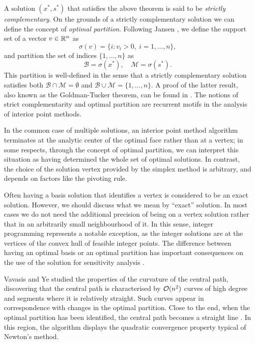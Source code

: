 A solution $(x^*,s^*)$ that satisfies the above theorem is said to be
{\em strictly complementary}. 
On the grounds of a strictly complementary
solution we can define the concept of {\em optimal partition}.
Following Jansen \cite{phd:Jansen}, we define the support set
of a vector $v \in \mathbb{R}^n$ as
\[
   \sigma(v) = \{ i : v_i > 0, \; i=1,\ldots,n \},
\]
and partition the set of indices $\{1,\ldots,n \}$ as
\[
   \mathcal{B} = \sigma(x^*), \quad \mathcal{M} = \sigma(s^*).
\]
This partition is well-defined in the sense that a 
strictly complementary solution satisfies both 
$\mathcal{B} \cap \mathcal{M} = \emptyset$ and 
$\mathcal{B} \cup \mathcal{M} = \{1,\ldots,n \}$. 
A proof of the latter result, also known as the Goldman-Tucker theorem, 
can be found in \cite{ipm:Wright97}.
The notions of strict complementarity and optimal partition are
recurrent motifs in the analysis of interior point methods.

In the common case of multiple solutions, an interior point method
algorithm terminates
at the analytic center of the optimal face rather than at a vertex; 
in some respects, through the concept of optimal partition, we can interpret
this situation as having determined the whole set of optimal solutions.
In contrast, the choice of the solution vertex provided by the simplex
method is arbitrary, and depends on factors like the pivoting rule.

Often having a basis solution that identifies a vertex is considered
to be an exact solution.
However, we should discuss what we mean by ``exact'' solution. In most
cases we do not need the additional precision of being on a vertex 
solution rather that in an arbitrarily small neighbourhood of it.
In this sense, integer programming represents a notable exception,
as the integer solutions are at the vertices of the
convex hull of feasible integer points.
The difference between having an optimal basis or an optimal partition
has important consequences on the use of the solution
for sensitivity analysis \cite{phd:Jansen,YildirimTodd01}.

Vavasis and Ye \cite{VavasisYe} studied the properties of the 
curvature of the central path, discovering that the central path
is characterised by $\mathcal{O}(n^2)$ curves of high degree and
segments where it is relatively straight.
Such curves appear in correspondence with changes in the optimal
partition.
Close to the end, when the optimal partition has been identified,
the central path becomes a straight line \cite{Megiddo}.
In this region, the algorithm displays the quadratic convergence 
property typical of Newton's method.


